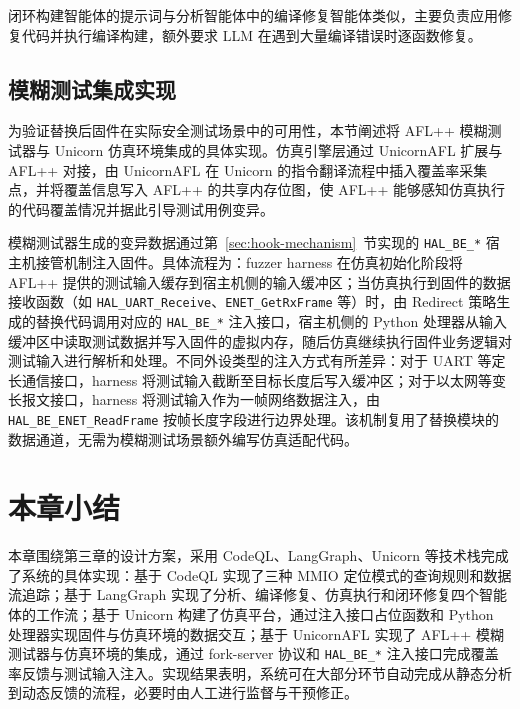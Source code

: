 闭环构建智能体的提示词与分析智能体中的编译修复智能体类似，主要负责应用修复代码并执行编译构建，额外要求 LLM 在遇到大量编译错误时逐函数修复。

\subsection{模糊测试集成实现}
\label{sec:fuzz-integration}

为验证替换后固件在实际安全测试场景中的可用性，本节阐述将 AFL++ 模糊测试器与 Unicorn 仿真环境集成的具体实现。仿真引擎层通过 UnicornAFL 扩展与 AFL++ 对接，由 UnicornAFL 在 Unicorn 的指令翻译流程中插入覆盖率采集点，并将覆盖信息写入 AFL++ 的共享内存位图，使 AFL++ 能够感知仿真执行的代码覆盖情况并据此引导测试用例变异。

模糊测试器生成的变异数据通过第~\ref{sec:hook-mechanism}~节实现的 \texttt{HAL\_BE\_*} 宿主机接管机制注入固件。具体流程为：fuzzer harness 在仿真初始化阶段将 AFL++ 提供的测试输入缓存到宿主机侧的输入缓冲区；当仿真执行到固件的数据接收函数（如 \texttt{HAL\_UART\_Receive}、\texttt{ENET\_GetRxFrame} 等）时，由 Redirect 策略生成的替换代码调用对应的 \texttt{HAL\_BE\_*} 注入接口，宿主机侧的 Python 处理器从输入缓冲区中读取测试数据并写入固件的虚拟内存，随后仿真继续执行固件业务逻辑对测试输入进行解析和处理。不同外设类型的注入方式有所差异：对于 UART 等定长通信接口，harness 将测试输入截断至目标长度后写入缓冲区；对于以太网等变长报文接口，harness 将测试输入作为一帧网络数据注入，由 \texttt{HAL\_BE\_ENET\_ReadFrame} 按帧长度字段进行边界处理。该机制复用了替换模块的数据通道，无需为模糊测试场景额外编写仿真适配代码。

\section{本章小结}

本章围绕第三章的设计方案，采用 CodeQL、LangGraph、Unicorn 等技术栈完成了系统的具体实现：基于 CodeQL 实现了三种 MMIO 定位模式的查询规则和数据流追踪；基于 LangGraph 实现了分析、编译修复、仿真执行和闭环修复四个智能体的工作流；基于 Unicorn 构建了仿真平台，通过注入接口占位函数和 Python 处理器实现固件与仿真环境的数据交互；基于 UnicornAFL 实现了 AFL++ 模糊测试器与仿真环境的集成，通过 fork-server 协议和 \texttt{HAL\_BE\_*} 注入接口完成覆盖率反馈与测试输入注入。实现结果表明，系统可在大部分环节自动完成从静态分析到动态反馈的流程，必要时由人工进行监督与干预修正。

